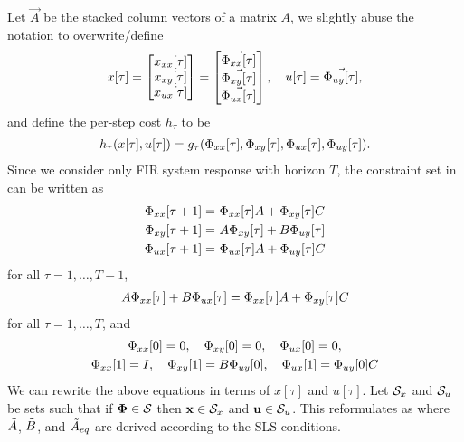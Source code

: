 Let $\Vec{A}$ be the stacked column vectors of a matrix $A$, we slightly abuse the notation to overwrite/define
\begin{align*}
x[\tau] = \begin{bmatrix}
x_{xx}[\tau] \\
x_{xy}[\tau] \\
x_{ux}[\tau]
\end{bmatrix}
= \begin{bmatrix}
\Vec{\Phi_{xx}[\tau]}\\ 
\Vec{\Phi_{xy}[\tau]}\\
\Vec{\Phi_{ux}[\tau]}
\end{bmatrix}, \quad
u[\tau] = \Vec{\Phi_{uy}[\tau]},
\end{align*}
and define the per-step cost $h_\tau$ to be
\begin{align*}
h_\tau(x[\tau],u[\tau]) = g_{\tau}(\Phi_{xx}[\tau],\Phi_{xy}[\tau],\Phi_{ux}[\tau],\Phi_{uy}[\tau]).
\end{align*}
Since we consider only FIR system response with horizon $T$, the constraint set in  can be written as
\begin{align*}
\Phi_{xx}[\tau + 1] =&\ \Phi_{xx}[\tau] A + \Phi_{xy}[\tau] C\\
\Phi_{xy}[\tau + 1] =&\ A \Phi_{xy}[\tau] + B \Phi_{uy}[\tau]\\
\Phi_{ux}[\tau + 1] =&\ \Phi_{ux}[\tau] A + \Phi_{uy}[\tau] C
\end{align*}
for all $\tau = 1,\dots,T - 1$, 
\begin{align*}
A \Phi_{xx}[\tau] + B \Phi_{ux}[\tau] = \Phi_{xx}[\tau] A + \Phi_{xy}[\tau] C
\end{align*}
for all $\tau = 1,\dots,T$, and 
\begin{gather*}
\Phi_{xx}[0] = 0, \quad \Phi_{xy}[0] = 0, \quad \Phi_{ux}[0] = 0,\\
\Phi_{xx}[1] = I, \quad \Phi_{xy}[1] = B \Phi_{uy}[0], \quad \Phi_{ux}[1] = \Phi_{uy}[0] C
\end{gather*}
We can rewrite the above equations in terms of $x[\tau]$ and $u[\tau]$. Let $\mathcal{S}_x$ and $\mathcal{S}_u$ be sets such that if $\bm{\Phi} \in \mathcal{S}$ then ${\bf x} \in \mathcal{S}_x$ and ${\bf u} \in \mathcal{S}_u$. This reformulates  as 
where $\tilde{A}$, $\tilde{B}$, and $\tilde{A}_{eq}$ are derived according to the SLS conditions. 

